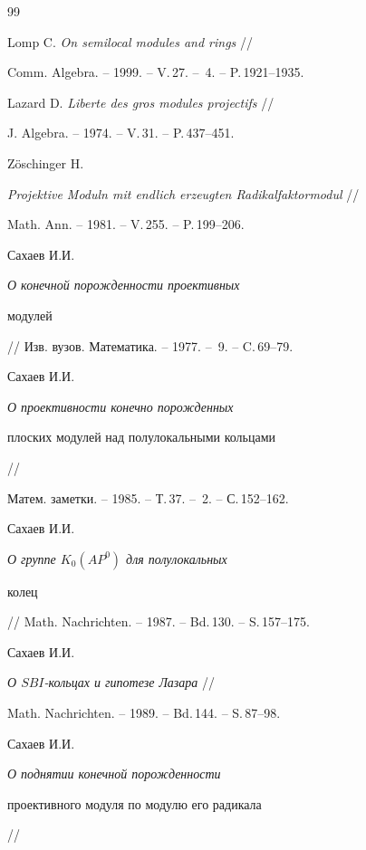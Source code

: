 \begin{thebibliography}{99} 







Lomp C. {\em On semilocal modules and rings} // 


Comm. Algebra. -- 1999. -- V.\,27. -- \No\,4. -- P.\,1921--1935.




Lazard D. {\em Liberte des gros modules projectifs} // 


J. Algebra. -- 1974. -- V.\,31. -- P.\,437--451. 




Z\"oschinger H.


{\em Projektive Moduln mit endlich erzeugten Radikalfaktormodul} // 


Math. Ann. -- 1981. -- V.\,255. -- P.\,199--206. 




Сахаев И.И.


{\em О конечной порожденности проективных 


модулей} // Изв. вузов. Математика. -- 1977. -- \No\,9. -- C.\,69--79.




Сахаев И.И.


{\em О проективности конечно порожденных 


плоских модулей над полулокальными кольцами} // 


Матем. заметки. -- 1985. -- Т.\,37. -- \No\,2. -- С.\,152--162.




Сахаев И.И.


{\em О группе $K_{0}(AP^{0})$ для полулокальных


колец} // Math. Nachrichten. -- 1987. -- Bd.\,130. -- S.\,157--175. 




Сахаев И.И.


{\em О $SBI$-кольцах и гипотезе Лазара} // 


Math. Nachrichten. -- 1989. -- Bd.\,144. -- S.\,87--98. 




Сахаев И.И.


{\em О поднятии конечной порожденности 


проективного модуля по модулю его радикала} // 



\end{thebibliography}
